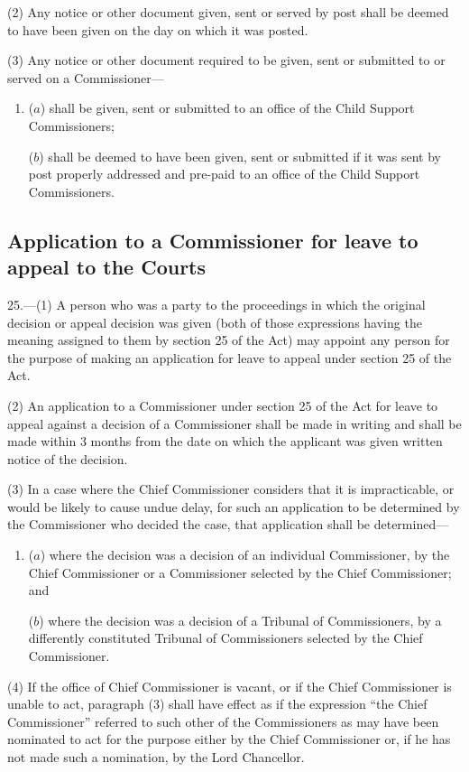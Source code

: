 \documentclass[12pt,a4paper]{article}
\begin{document}
(2) Any notice or other document given, sent or served by post shall be deemed to have been given on the day on which it was posted.

(3) Any notice or other document required to be given, sent or submitted to or served on a Commissioner—
\begin{enumerate}\item[]
($a$) shall be given, sent or submitted to an office of the Child Support Commissioners;

($b$) shall be deemed to have been given, sent or submitted if it was sent by post properly addressed and pre-paid to an office of the Child Support Commissioners.
\end{enumerate}

\subsection[25. Application to a Commissioner for leave to appeal to the Courts]{Application to a Commissioner for leave to appeal to the Courts}

25.—(1) A person who was a party to the proceedings in which the original decision or appeal decision was given (both of those expressions having the meaning assigned to them by section 25 of the Act) may appoint any person for the purpose of making an application for leave to appeal under section 25 of the Act.

(2) An application to a Commissioner under section 25 of the Act for leave to appeal against a decision of a Commissioner shall be made in writing and shall be made within 3 months from the date on which the applicant was given written notice of the decision.

(3) In a case where the Chief Commissioner considers that it is impracticable, or would be likely to cause undue delay, for such an application to be determined by the Commissioner who decided the case, that application shall be determined—
\begin{enumerate}\item[]
($a$) where the decision was a decision of an individual Commissioner, by the Chief Commissioner or a Commissioner selected by the Chief Commissioner; and

($b$) where the decision was a decision of a Tribunal of Commissioners, by a differently constituted Tribunal of Commissioners selected by the Chief Commissioner.
\end{enumerate}

(4) If the office of Chief Commissioner is vacant, or if the Chief Commissioner is unable to act, paragraph (3) shall have effect as if the expression “the Chief Commissioner” referred to such other of the Commissioners as may have been nominated to act for the purpose either by the Chief Commissioner or, if he has not made such a nomination, by the Lord Chancellor.
\end{document}
